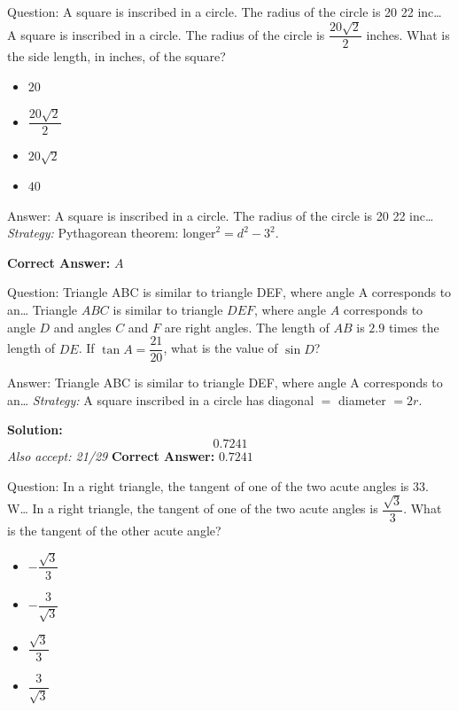 \documentclass{beamer}
\begin{document}
\begin{frame}{Question: A square is inscribed in a circle. The radius of the circle is 20 22 inc…}
A square is inscribed in a circle. The radius of the circle is $\dfrac{20\sqrt{2}}{2}$ inches. What is the side length, in inches, of the square?
\begin{itemize}
    \item[\textbf{A.}] $20$
    \item[\textbf{B.}] $\dfrac{20\sqrt{2}}{2}$
    \item[\textbf{C.}] $20\sqrt{2}$
    \item[\textbf{D.}] $40$
\end{itemize}
\end{frame}
\begin{frame}{Answer: A square is inscribed in a circle. The radius of the circle is 20 22 inc…}
\textit{Strategy:} Pythagorean theorem: $\text{longer}^2 = d^2 - 3^2$.

\textbf{Correct Answer:} \( \boxed{A} \)

\end{frame}
\begin{frame}{Question: Triangle ABC is similar to triangle DEF, where angle A corresponds to an…}
Triangle $ABC$ is similar to triangle $DEF$, where angle $A$ corresponds to angle $D$ and angles $C$ and $F$ are right angles. The length of $AB$ is $2.9$ times the length of $DE$. If $\tan A = \dfrac{21}{20}$, what is the value of $\sin D$?
\end{frame}
\begin{frame}{Answer: Triangle ABC is similar to triangle DEF, where angle A corresponds to an…}
\textit{Strategy:} A square inscribed in a circle has diagonal $=$ diameter $=2r$.

\textbf{Solution:}
\[ \boxed{0.7241} \]
\textit{Also accept: 21/29}
\textbf{Correct Answer:} \( \boxed{0.7241} \)

\end{frame}
\begin{frame}{Question: In a right triangle, the tangent of one of the two acute angles is 33. W…}
In a right triangle, the tangent of one of the two acute angles is $\dfrac{\sqrt{3}}{3}$. What is the tangent of the other acute angle?
\begin{itemize}
    \item[\textbf{A.}] $-\dfrac{\sqrt{3}}{3}$
    \item[\textbf{B.}] $-\dfrac{3}{\sqrt{3}}$
    \item[\textbf{C.}] $\dfrac{\sqrt{3}}{3}$
    \item[\textbf{D.}] $\dfrac{3}{\sqrt{3}}$
\end{itemize}
\end{frame}
\end{document}
